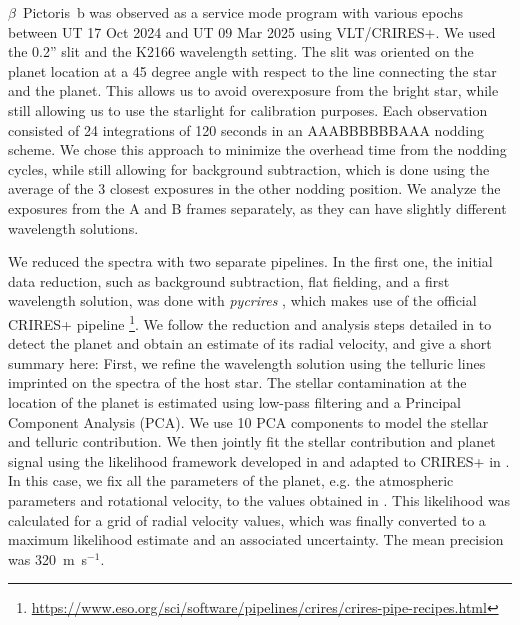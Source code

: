 \documentclass[fleqn,usenatbib]{mnras}
\newcommand{\bpb}{$\beta$~Pictoris~b}
\begin{document}
\bpb{} was observed as a service mode program with various epochs between UT 17 Oct 2024 and UT 09 Mar 2025 using VLT/CRIRES+.
%
We used the 0.2'' slit and the K2166 wavelength setting.
%
The slit was oriented on the planet location at a 45 degree angle with respect to the line connecting the star and the planet.
%
This allows us to avoid overexposure from the bright star, while still allowing us to use the starlight for calibration purposes.
%
Each observation consisted of 24 integrations of 120 seconds in an AAABBBBBBAAA nodding scheme.
%
We chose this approach to minimize the overhead time from the nodding cycles, while still allowing for background subtraction, which is done using the average of the 3 closest exposures in the other nodding position.
%
We analyze the exposures from the A and B frames separately, as they can have slightly different wavelength solutions.

%                                  
%                                                                         

We reduced the spectra with two separate pipelines.
%
In the first one, the initial data reduction, such as background subtraction, flat fielding, and a first wavelength solution, was done with \textit{pycrires} \citep{stolker2023_pycrires}, which makes use of the official CRIRES+ pipeline \footnote{\url{https://www.eso.org/sci/software/pipelines/crires/crires-pipe-recipes.html}}.
%
We follow the reduction and analysis steps detailed in \citet{Landman24b} to detect the planet and obtain an estimate of its radial velocity, and give a short summary here: First, we refine the wavelength solution using the telluric lines imprinted on the spectra of the host star.
%
The stellar contamination at the location of the planet is estimated using low-pass filtering and a Principal Component Analysis (PCA).
%
We use 10 PCA components to model the stellar and telluric contribution.
%
We then jointly fit the stellar contribution and planet signal using the likelihood framework developed in \citet{ruffio2021AJ_hr8799_osiris} and adapted to CRIRES+ in \citet{Landman24b}.
%
In this case, we fix all the parameters of the planet, e.g. the atmospheric parameters and rotational velocity, to the values obtained in \citet{Landman24b}.
%
This likelihood was calculated for a grid of radial velocity values, which was finally converted to a maximum likelihood estimate and an associated uncertainty.
%
The mean precision was 320~m~s$^{-1}$.
\end{document}
